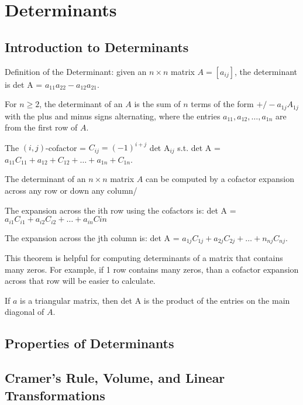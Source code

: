 \documentclass[../linalg.tex]{subfiles}
\begin{document}
\chapter{Determinants}
\section{Introduction to Determinants}
Definition of the Determinant: given an $n\times n$ matrix $A=[a_{ij}]$, the determinant is det A = $a_{11}a_{22}-a_{12}a_{21}$.

For $n\geq 2$, the determinant of an $A$ is the sum of $n$ terms of the form $+/-a_{1j}A_{1j}$ with the plus and minus signs alternating, where the entries $a_{11},a_{12},\dots, a_{1n}$ are from the first row of $A$. 

The $(i,j)$-cofactor = $C_{ij}=(-1)^{i+j}$ det A$_{ij}$ s.t. det A = $a_{11}C_{11}+a_{12}+C_{12}+\dots + a_{1n}+C_{1n}$.

\begin{theorem}
    The determinant of an $n\times n$ matrix $A$ can be computed by a cofactor expansion across any row or down any column/

    The expansion across the ith row using the cofactors is: det A = $a_{i1}C_{i1}+a_{i2}C_{i2}+\dots +a_{in}C{in}$

    The expansion across the jth column is: det A = $a_{1j}C_{1j}+a_{2j}C_{2j}+\dots + n_{nj}C_{nj}$.
\end{theorem}

This theorem is helpful for computing determinants of a matrix that contains many zeros. For example, if 1 row contains many zeros, than a cofactor expansion across that row will be easier to calculate.

\begin{theorem}
    If $a$ is a triangular matrix, then det A is the product of the entries on the main diagonal of $A$.
\end{theorem}

\section{Properties of Determinants}
\section{Cramer's Rule, Volume, and Linear Transformations}
\end{document}
